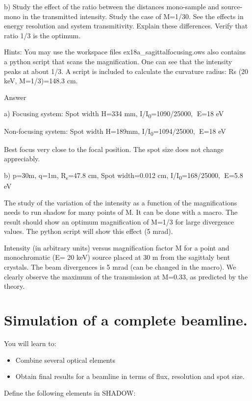 \documentclass[]{article}
\providecommand{\tightlist}{%
  \setlength{\itemsep}{0pt}\setlength{\parskip}{0pt}}
\begin{document}
b) Study the effect of the ratio between the distances mono-sample and
source-mono in the transmitted intensity. Study the case of M=1/30. See
the effects in energy resolution and system transmitivity. Explain these
differences. Verify that ratio 1/3 is the optimum.

Hints: You may use the workspace files ex18a\_sagittalfocusing.ows also
contains a python script that scans the magnification. One can see that
the intensity peaks at about 1/3. A script is included to calculate the
curvature radius: Rs (20 keV, M=1/3)=148.3 cm.

Answer

a) Focusing system: Spot width H=334 mm,
I/I\textsubscript{0}=1090/25000, E=18 eV

Non-focusing system: Spot width H=189mm,
I/I\textsubscript{0}=1094/25000, E=18 eV

Best focus very close to the focal position. The spot size does not
change appreciably.

b) p=30m, q=1m, R\textsubscript{s}=47.8 cm, Spot width=0.012 cm,
I/I\textsubscript{0}=168/25000, E=5.8 eV

The study of the variation of the intensity as a function of the
magnifications needs to run shadow for many points of M. It can be done
with a macro. The result should show an optimum magnification of M=1/3
for large divergence values. The python script will show this effect (5
mrad).

Intensity (in arbitrary units) versus magnification factor M for a point
and monochromatic (E= 20 keV) source placed at 30 m from the sagittaly
bent crystals. The beam divergences is 5 mrad (can be changed in the
macro). We clearly observe the maximum of the transmission at M=0.33, as
predicted by the theory.

\section{Simulation of a complete
beamline.}\label{simulation-of-a-complete-beamline.}

You will learn to:

\begin{itemize}
\tightlist
\item
  Combine several optical elements
\item
  Obtain final results for a beamline in terms of flux, resolution and
  spot size. 
\end{itemize}

Define the following elements in SHADOW:
\end{document}
